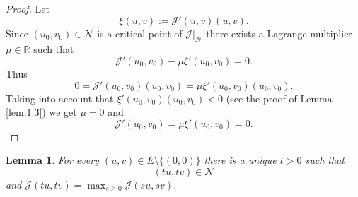 \documentclass{scrartcl}
\newtheorem{Lem}[Th]{Lemma}
\newcommand{\cJ}{{\mathcal J}}
\newcommand{\cN}{{\mathcal N}}
\newcommand{\R}{\mathbb{R}}
\numberwithin{equation}{section}
\begin{document}
\begin{proof}
Let
$$
\xi(u,v) := \cJ'(u,v)(u,v).
$$
Since $(u_0,v_0) \in \cN$ is a critical point of $\cJ \Big|_\cN$ there exists a Lagrange multiplier $\mu \in \R$ such that
$$
\cJ'(u_0,v_0) - \mu \xi'(u_0,v_0) = 0.
$$
Thus
$$
0 = \cJ'(u_0,v_0)(u_0,v_0) = \mu \xi'(u_0,v_0)(u_0,v_0).
$$
Taking into account that $\xi'(u_0,v_0)(u_0,v_0) < 0$ (see the proof of Lemma \ref{lem:1.3}) we get $\mu = 0$ and 
$$
\cJ'(u_0,v_0) = \mu \xi'(u_0,v_0) = 0.
$$
\end{proof}

\begin{Lem}\label{lem:1.7}
For every $(u,v) \in E \setminus \{(0,0)\}$ there is a unique $t > 0$ such that
$$
(tu,tv) \in \cN
$$
and $\cJ(tu,tv) = \max_{s \geq 0} \cJ(su,sv)$.
\end{Lem}
\end{document}
